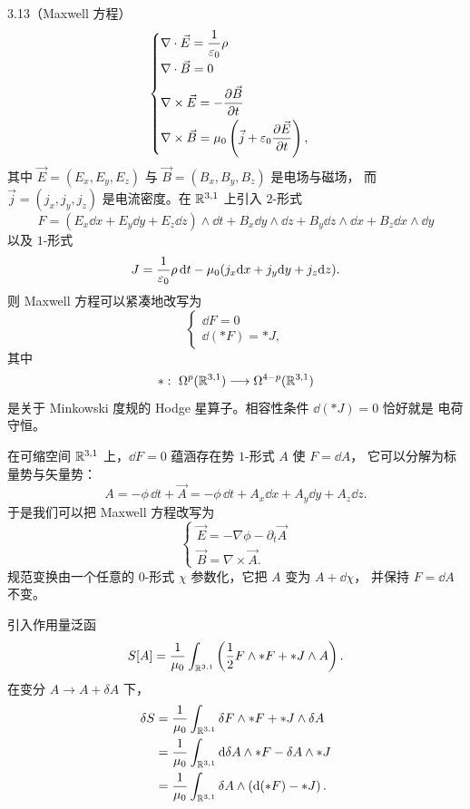\begin{wexam}{3.13}（Maxwell 方程）
  \[
    \begin{cases}
      \nabla\cdot\vec E=\dfrac{1}{\varepsilon_{0}}\rho\\[6pt]
      \nabla\cdot\vec B=0\\[6pt]
      \nabla\times\vec E=-\dfrac{\partial\vec B}{\partial t}\\[6pt]
      \nabla\times\vec B=\mu_{0}\left(\vec j
      +\varepsilon_{0}\dfrac{\partial\vec E}{\partial t}\right),
    \end{cases}
  \]
  其中 $\vec E=(E_{x},E_{y},E_{z})$ 与 $\vec B=(B_{x},B_{y},B_{z})$ 是电场与磁场，
  而 $\vec j=(j_{x},j_{y},j_{z})$ 是电流密度。在 $\mathbb{R}^{3,1}$ 上引入 $2$-形式
  \[
    F=(E_{x}\dd x+E_{y}\dd y+E_{z}\dd z)\wedge\dd t
    +B_{x}\dd y\wedge\dd z+B_{y}\dd z\wedge\dd x+B_{z}\dd x\wedge\dd y
  \]
  以及 $1$-形式
  \[
    J=\frac{1}{\varepsilon_{0}}\rho\,\mathrm{d} t
    -\mu_{0}(j_{x}\mathrm{d} x+j_{y}\mathrm{d} y+j_{z}\mathrm{d} z).
  \]
  则 Maxwell 方程可以紧凑地改写为
  \[
    \begin{cases}
      \dd F=0\\
      \dd({*}F)={*}J,
    \end{cases}
  \]
  其中
  \[
    {*}:\ \Omega^{p}(\R^{3,1})\longrightarrow\Omega^{4-p}(\R^{3,1})
  \]
  是关于 Minkowski 度规的 Hodge 星算子。相容性条件 $\dd({*}J)=0$ 恰好就是
  电荷守恒。

  在可缩空间 $\mathbb{R}^{3,1}$ 上，$\dd F=0$ 蕴涵存在势 $1$-形式 $A$ 使 $F=\dd A$，
  它可以分解为标量势与矢量势：
  \[
    A=-\phi\,\dd t+\vec A
    =-\phi\,\dd t+A_{x}\dd x+A_{y}\dd y+A_{z}\dd z.
  \]
  于是我们可以把 Maxwell 方程改写为
  \[
    \begin{cases}
      \vec E=-\nabla\phi-\partial_{t}\vec A\\[6pt]
      \vec B=\nabla\times\vec A.
    \end{cases}
  \]
  规范变换由一个任意的 $0$-形式 $\chi$ 参数化，它把 $A$ 变为 $A+\dd\chi$，
  并保持 $F=\dd A$ 不变。

  引入作用量泛函
  \[
    S[A]=\frac{1}{\mu_{0}}\int_{\mathbb{R}^{3,1}}
    \left(\frac{1}{2}F\wedge{*}F+{*}J\wedge A\right).
  \]
  在变分 $A\to A+\delta A$ 下，
  \[
    \begin{aligned}
      \delta S&=\frac{1}{\mu_{0}}\int_{\mathbb{R}^{3,1}}
      \delta F\wedge{*}F+{*}J\wedge\delta A\\
      &=\frac{1}{\mu_{0}}\int_{\mathbb{R}^{3,1}}
      \mathrm{d}\delta A\wedge{*}F-\delta A\wedge{*}J\\
      &=\frac{1}{\mu_{0}}\int_{\mathbb{R}^{3,1}}
      \delta A\wedge\left(\mathrm{d}({*}F)-{*}J\right).
    \end{aligned}
  \]
\end{wexam}

